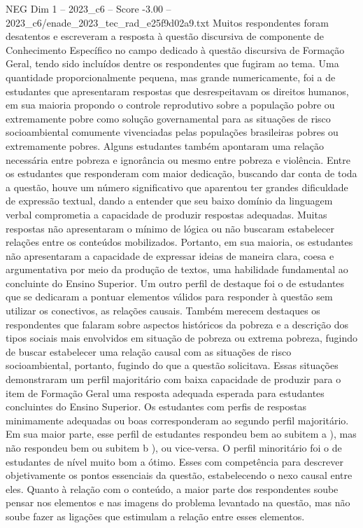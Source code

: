 \begin{textsample}{NEG Dim 1 – 2023\_c6 – Score -3.00 – 2023\_c6/enade\_2023\_tec\_rad\_e25f9d02a9.txt}
Muitos respondentes foram desatentos e escreveram a resposta à questão discursiva de componente de Conhecimento Específico no campo dedicado à questão discursiva de Formação Geral, tendo sido incluídos dentre os respondentes que fugiram ao tema.
Uma quantidade proporcionalmente pequena, mas grande numericamente, foi a de estudantes que apresentaram respostas que desrespeitavam os direitos humanos, em sua maioria propondo o controle reprodutivo sobre a população pobre ou extremamente pobre como solução governamental para as situações de risco socioambiental comumente vivenciadas pelas populações brasileiras pobres ou extremamente pobres.
Alguns estudantes também apontaram uma relação necessária entre pobreza e ignorância ou mesmo entre pobreza e violência.
Entre os estudantes que responderam com maior dedicação, buscando dar conta de toda a questão, houve um número significativo que aparentou ter grandes dificuldade de expressão textual, dando a entender que seu baixo domínio da linguagem verbal comprometia a capacidade de produzir respostas adequadas.
Muitas respostas não apresentaram o mínimo de lógica ou não buscaram estabelecer relações entre os conteúdos mobilizados.
Portanto, em sua maioria, os estudantes não apresentaram a capacidade de expressar ideias de maneira clara, coesa e argumentativa por meio da produção de textos, uma habilidade fundamental ao concluinte do Ensino Superior.
Um outro perfil de destaque foi o de estudantes que se dedicaram a pontuar elementos válidos para responder à questão sem utilizar os conectivos, as relações causais.
Também merecem destaques os respondentes que falaram sobre aspectos históricos da pobreza e a descrição dos tipos sociais mais envolvidos em situação de pobreza ou extrema pobreza, fugindo de buscar estabelecer uma relação causal com as situações de risco socioambiental, portanto, fugindo do que a questão solicitava.
Essas situações demonstraram um perfil majoritário com baixa capacidade de produzir para o item de Formação Geral uma resposta adequada esperada para estudantes concluintes do Ensino Superior.
Os estudantes com perfis de respostas minimamente adequadas ou boas corresponderam ao segundo perfil majoritário.
Em sua maior parte, esse perfil de estudantes respondeu bem ao subitem a ), mas não respondeu bem ou subitem b ), ou vice-versa.
O perfil minoritário foi o de estudantes de nível muito bom a ótimo.
Esses com competência para descrever objetivamente os pontos essenciais da questão, estabelecendo o nexo causal entre eles.
Quanto à relação com o conteúdo, a maior parte dos respondentes soube pensar nos elementos e nas imagens do problema levantado na questão, mas não soube fazer as ligações que estimulam a relação entre esses elementos.

\end{textsample}
